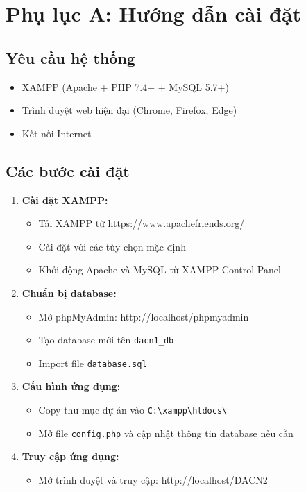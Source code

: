 \documentclass[12pt,a4paper]{report}
\begin{document}
\section*{Phụ lục A: Hướng dẫn cài đặt}

\subsection*{Yêu cầu hệ thống}
\begin{itemize}
    \item XAMPP (Apache + PHP 7.4+ + MySQL 5.7+)
    \item Trình duyệt web hiện đại (Chrome, Firefox, Edge)
    \item Kết nối Internet
\end{itemize}

\subsection*{Các bước cài đặt}

\begin{enumerate}
    \item \textbf{Cài đặt XAMPP:}
    \begin{itemize}
        \item Tải XAMPP từ https://www.apachefriends.org/
        \item Cài đặt với các tùy chọn mặc định
        \item Khởi động Apache và MySQL từ XAMPP Control Panel
    \end{itemize}
    
    \item \textbf{Chuẩn bị database:}
    \begin{itemize}
        \item Mở phpMyAdmin: http://localhost/phpmyadmin
        \item Tạo database mới tên \texttt{dacn1\_db}
        \item Import file \texttt{database.sql}
    \end{itemize}
    
    \item \textbf{Cấu hình ứng dụng:}
    \begin{itemize}
        \item Copy thư mục dự án vào \texttt{C:\textbackslash xampp\textbackslash htdocs\textbackslash}
        \item Mở file \texttt{config.php} và cập nhật thông tin database nếu cần
    \end{itemize}
    
    \item \textbf{Truy cập ứng dụng:}
    \begin{itemize}
        \item Mở trình duyệt và truy cập: http://localhost/DACN2
    \end{itemize}
\end{enumerate}
\end{document}

